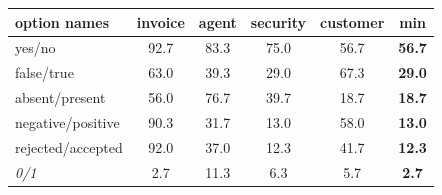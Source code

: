 \setlength{\tabcolsep}{3pt}
\begin{tabular}{@{}lccccc@{}}
\toprule
option names & invoice & agent & security & customer & min \\
\midrule
yes/no & 92.7 & 83.3 & 75.0 & 56.7 & \textbf{56.7} \\
false/true & 63.0 & 39.3 & 29.0 & 67.3 & \textbf{29.0} \\
absent/present & 56.0 & 76.7 & 39.7 & 18.7 & \textbf{18.7} \\
negative/positive & 90.3 & 31.7 & 13.0 & 58.0 & \textbf{13.0} \\
rejected/accepted & 92.0 & 37.0 & 12.3 & 41.7 & \textbf{12.3} \\
\midrule
\textit{0/1} & 2.7 & 11.3 & 6.3 & 5.7 & \textbf{2.7} \\
\bottomrule
\end{tabular}
